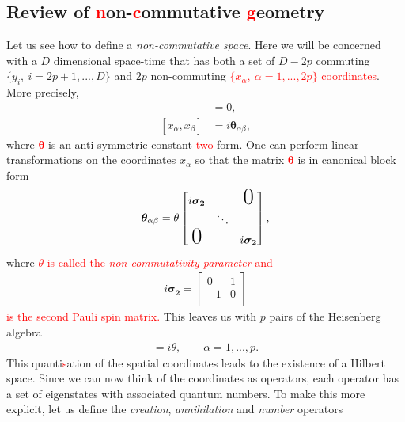     \subsection{Review of \textcolor{red}{n}on-\textcolor{red}{c}ommutative \textcolor{red}{g}eometry}
    Let us see how to define a \textit{non-commutative space}. Here we will be concerned with a $D$ dimensional space-time that has both a set of $D-2p$ commuting $\{ y_i, \ i=2p+1,...,D\}$ and $2p$ non-commuting \textcolor{red}{$\{ x_\alpha, \ \alpha =1,...,2p\}$ coordinates}. More precisely,
    \begin{align}
        [y_i, y_j] &=0,\\
        [x_{\alpha}, x_{\beta}] &=i \bm{\theta}_{\alpha \beta}, \label{eq:space_time_commutations}
    \end{align}
    where \textcolor{red}{${ \bm \theta}$} is an anti-symmetric constant \textcolor{red}{two}-form. One can perform linear transformations on the coordinates $x_{\alpha}$ so that the matrix \textcolor{red}{${ \bm \theta}$} is in canonical block form
    \begin{align}
        \bm{\theta}_{\alpha \beta } = \theta \begin{bmatrix}
            i \bm{\sigma_2} &  & \text{\huge0} \\
                     & \ddots &  \\
                    \text{\huge0} &  & i \bm{\sigma_2} \\
                \end{bmatrix},
    \end{align}
    where \textcolor{red}{$\theta$ is called the \textit{non-commutativity parameter} and}
    \begin{align}
        i \bm{\sigma_2} = \begin{bmatrix}
            0 & 1 \\
            -1 & 0 \\
        \end{bmatrix}
    \end{align}
    \textcolor{red}{is the second Pauli spin matrix.}
    This leaves us with $p$ pairs of the Heisenberg algebra
    \begin{align}
        [x_{2\alpha -1}, x_{2\alpha}]=i\theta, \qquad \alpha=1,...,p.
    \end{align}
    This quanti\textcolor{red}{s}ation of the spatial coordinates leads to the existence of a Hilbert space. Since we can now think of the coordinates as operators, \colorbox{red}{ } each operator has a set of eigenstates with associated quantum numbers. To make this more explicit, let us define the \textit{creation}, \textit{annihilation} and \textit{number} operators
